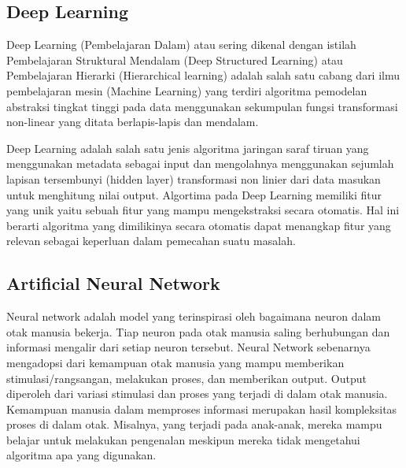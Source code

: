 \subsection{Deep Learning}
Deep Learning (Pembelajaran Dalam) atau sering dikenal dengan istilah Pembelajaran Struktural Mendalam (Deep Structured Learning) atau Pembelajaran Hierarki (Hierarchical learning) adalah salah satu cabang dari ilmu pembelajaran mesin (Machine Learning) yang terdiri algoritma pemodelan abstraksi tingkat tinggi pada data menggunakan sekumpulan fungsi transformasi non-linear yang ditata berlapis-lapis dan mendalam.

Deep Learning adalah salah satu jenis algoritma jaringan saraf tiruan yang menggunakan metadata sebagai input dan mengolahnya menggunakan sejumlah lapisan tersembunyi (hidden layer) transformasi non linier dari data masukan untuk menghitung nilai output. Algortima pada Deep Learning memiliki fitur yang unik yaitu sebuah fitur yang mampu mengekstraksi secara otomatis. Hal ini berarti algoritma yang dimilikinya secara otomatis dapat menangkap fitur yang relevan sebagai keperluan dalam pemecahan suatu masalah.

\subsection{Artificial Neural Network}
Neural network adalah model yang terinspirasi oleh bagaimana neuron dalam otak manusia bekerja. Tiap neuron pada otak manusia saling berhubungan dan informasi mengalir dari setiap neuron tersebut. Neural Network sebenarnya mengadopsi dari kemampuan otak manusia yang mampu memberikan stimulasi/rangsangan, melakukan proses, dan memberikan output. Output diperoleh dari variasi stimulasi dan proses yang terjadi di dalam otak manusia. Kemampuan manusia dalam memproses informasi merupakan hasil kompleksitas proses di dalam otak. Misalnya, yang terjadi pada anak-anak, mereka mampu belajar untuk melakukan pengenalan meskipun mereka tidak mengetahui algoritma apa yang digunakan. 






